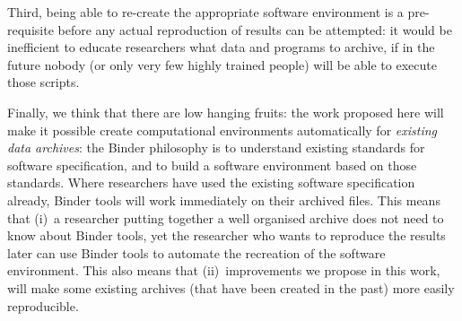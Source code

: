 Third, being able to re-create the appropriate software environment is a
pre-requisite before any actual reproduction of results can be attempted: it
would be inefficient to educate researchers what data and programs to archive,
if in the future nobody (or only very few highly trained people) will be able to
execute those scripts.

Finally, we think that there are low hanging fruits: the work proposed here will
make it possible create computational environments automatically for
\emph{existing data archives}: the Binder philosophy is to understand existing standards for software
specification, and to build a software environment based on those standards.
Where researchers have used the existing software specification already, Binder tools
will work immediately on their archived files. This means that (i)~a researcher
putting together a well organised archive does not need to know about Binder tools,
yet the researcher who wants to reproduce the results later can use Binder tools to
automate the recreation of the software environment. This also means that
(ii)~improvements we propose in this work, will make some existing archives (that
have been created in the past) more easily reproducible.


